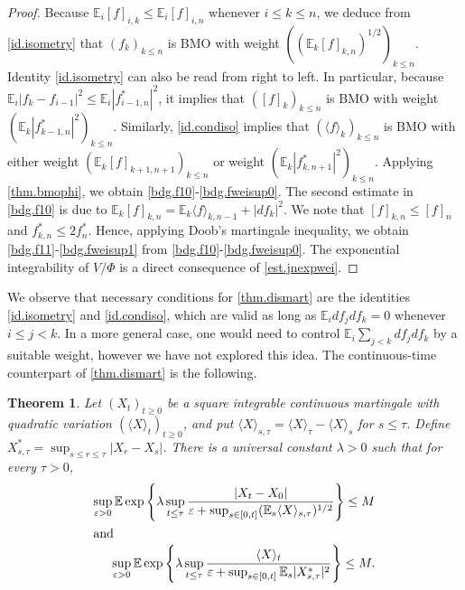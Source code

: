 \documentclass[12pt,oneside,reqno,fleqn]{amsart}
\numberwithin{equation}{section}
\newtheorem{theorem}{Theorem}[section]
\theoremstyle{remark}
\newcommand\mE{{\mathbb E}}
\newcommand\E{\mE}
\newcommand{\tand}{\quad\text{and}\quad}
\newcommand{\1}{{\mathbf 1}}
\newcommand{\wei}[1]{\langle#1\rangle}
\renewcommand{\le}{\leq}
\renewcommand{\ge}{\geq}
\begin{document}
	\begin{proof}
		Because $\E_i[f]_{i,k}\le\E_i[f]_{i,n}$ whenever $i\le k\le n$, we deduce from \eqref{id.isometry} that $(f_k)_{k\le n}$ is BMO with  weight $\left((\E_k[f]_{k,n})^{1/2}\right)_{k\le n}$.
		Identity \eqref{id.isometry} can also be read from right to left. In particular, because $\E_i|f_k-f_{i-1}|^2\le \E_i|f^*_{i-1,n}|^2$, it implies that $([f]_k)_{k\le n}$ is BMO with weight $(\E_k|f^*_{k-1,n}|^2)_{k\le n}$.
		Similarly, \eqref{id.condiso} implies that $(\wei{f}_k)_{k\le n}$ is BMO with either weight $(\E_k[f]_{k+1,n+1})_{k\le n}$ or weight $(\E_k|f^*_{k,n+1}|^2)_{k\le n}$.
		Applying \cref{thm.bmophi}, we obtain \eqref{bdg.f10}-\eqref{bdg.fweisup0}. The second estimate in \eqref{bdg.f10} is due to $\E_k[f]_{k,n}=\E_k\wei{f}_{k,n-1}+|df_k|^2$.
		We note that $[f]_{k,n}\le[f]_n$ and $f^*_{k,n}\le 2f^*_n$. Hence, applying Doob's martingale inequality, we obtain \eqref{bdg.f11}-\eqref{bdg.fweisup1} from \eqref{bdg.f10}-\eqref{bdg.fweisup0}.  The exponential integrability of $V/\Phi$ is a direct consequence of \eqref{est.jnexpwei}.
	\end{proof}
	We observe that necessary conditions for \cref{thm.dismart} are the identities \eqref{id.isometry} and \eqref{id.condiso}, which are valid as long as $\E_i df_j df_k=0$ whenever $i\le j< k$. In a more general case, one would need to control $\E_i\sum_{j<k} df_j df_k$ by a suitable weight, however we have not explored this idea.
	The continuous-time counterpart of \cref{thm.dismart} is the following.
	\begin{theorem}\label{thm.contmart}
		Let $(X_t)_{t\ge0}$ be a square integrable continuous martingale with quadratic variation $(\wei{X}_t)_{t\ge0}$, and put $\wei{X}_{s,\tau}=\wei{X}_\tau-\wei{X}_s$ for $s\le\tau$. Define $X^*_{s,\tau}=\sup_{s\le r\le \tau}|X_r-X_s|$.
		There is a universal constant $\lambda>0$  such that for every $\tau>0$,
		\begin{align}
			\sup_{\varepsilon>0}\E \exp\left\{\lambda\sup_{t\le \tau}\frac{|X_t-X_0|}{\varepsilon+\sup_{s\in[0,t]}(\E_s\wei{X}_{s,\tau})^{1/2}}\right\}\le M
			\\\shortintertext{and}
			\sup_{\varepsilon>0}\E \exp\left\{\lambda\sup_{t\le \tau}\frac{\wei{X}_t}{\varepsilon+\sup_{s\in[0,t]}\E_s|X^*_{s,\tau}|^2}\right\}\le M.
		\end{align}		
	\end{theorem}
\end{document}
